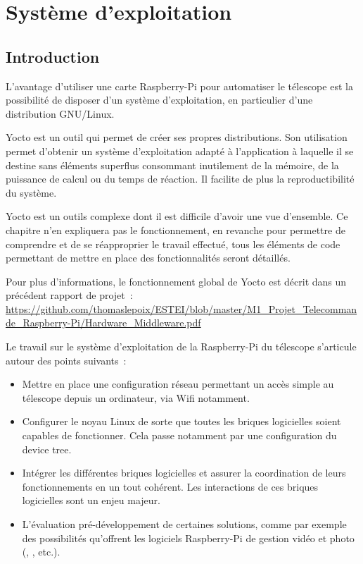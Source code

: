 \chapter{Système d'exploitation}

\section{Introduction}

L'avantage d'utiliser une carte Raspberry-Pi pour automatiser le télescope est la possibilité de disposer d'un système d'exploitation, en particulier d'une distribution GNU/Linux.

\vspace{1cm}

Yocto est un outil qui permet de créer ses propres distributions. Son utilisation permet d'obtenir un système d'exploitation adapté à l'application à laquelle il se destine sans éléments superflus consommant inutilement de la mémoire, de la puissance de calcul ou du temps de réaction. Il facilite de plus la reproductibilité du système.

Yocto est un outils complexe dont il est difficile d'avoir une vue d'ensemble. Ce chapitre n'en expliquera pas le fonctionnement, en revanche pour permettre de comprendre et de se réapproprier le travail effectué, tous les éléments de code permettant de mettre en place des fonctionnalités seront détaillés.

Pour plus d'informations, le fonctionnement global de Yocto est décrit dans un précédent rapport de projet~: \url{https://github.com/thomaslepoix/ESTEI/blob/master/M1_Projet_Telecommande_Raspberry-Pi/Hardware_Middleware.pdf}

\vspace{1cm}

Le travail sur le système d'exploitation de la Raspberry-Pi du télescope s'articule autour des points suivants~:
\begin{itemize}[label=$\bullet$]
	\item Mettre en place une configuration réseau permettant un accès simple au télescope depuis un ordinateur, via Wifi notamment.
	\item Configurer le noyau Linux de sorte que toutes les briques logicielles soient capables de fonctionner. Cela passe notamment par une configuration du device tree.
	\item Intégrer les différentes briques logicielles et assurer la coordination de leurs fonctionnements en un tout cohérent. Les interactions de ces briques logicielles sont un enjeu majeur.
	\item L'évaluation pré-développement de certaines solutions, comme par exemple des possibilités qu'offrent les logiciels Raspberry-Pi de gestion vidéo et photo (, , etc.).
	\end{itemize}

